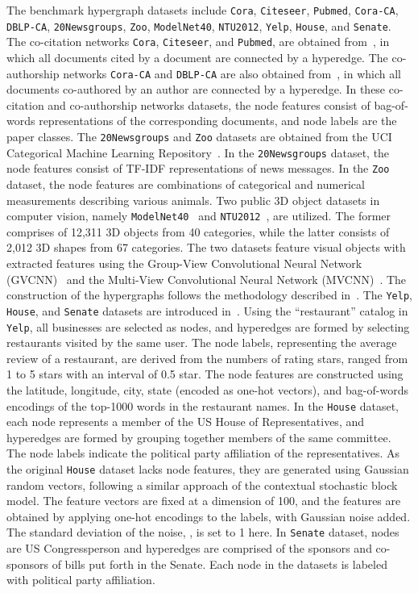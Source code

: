 \documentclass[review]{elsarticle}
\begin{document}
The benchmark hypergraph datasets include \texttt{Cora}, \texttt{Citeseer}, \texttt{Pubmed}, \texttt{Cora-CA}, \texttt{DBLP-CA}, \texttt{20Newsgroups}, \texttt{Zoo}, \texttt{ModelNet40}, \texttt{NTU2012}, \texttt{Yelp}, \texttt{House}, and \texttt{Senate}. The co-citation networks \texttt{Cora}, \texttt{Citeseer}, and \texttt{Pubmed}, are obtained from~\cite{yadati2019hypergcn}, in which all documents cited by a document are connected by a hyperedge. The co-authorship networks \texttt{Cora-CA} and \texttt{DBLP-CA} are also obtained from~\cite{yadati2019hypergcn}, in which all documents co-authored by an author are connected by a hyperedge. In these co-citation and co-authorship networks datasets, the node features consist of bag-of-words representations of the corresponding documents, and node labels are the paper classes. The \texttt{20Newsgroups} and \texttt{Zoo} datasets are obtained from the UCI Categorical Machine Learning Repository~\cite{asuncion2007uci}. In the \texttt{20Newsgroups} dataset, the node features consist of TF-IDF representations of news messages. In the \texttt{Zoo} dataset, the node features are combinations of categorical and numerical measurements describing various animals. Two public 3D object datasets in computer vision, namely \texttt{ModelNet40}~\cite{wu20153d} and \texttt{NTU2012}~\cite{chen2003visual}, are utilized. The former comprises of 12,311 3D objects from 40 categories, while the latter consists of 2,012 3D shapes from 67 categories. The two datasets feature visual objects with extracted features using the Group-View Convolutional Neural Network (GVCNN)~\cite{feng2018gvcnn} and the Multi-View Convolutional Neural Network (MVCNN)~\cite{su2015multi}. The construction of the hypergraphs follows the methodology described in~\cite{feng2019hypergraph,yang2022semi}. The \texttt{Yelp}, \texttt{House}, and \texttt{Senate} datasets are introduced in~\cite{chien2021you,fowler2006legislative}. Using the ``restaurant'' catalog in \texttt{Yelp}, all businesses are selected as nodes, and hyperedges are formed by selecting restaurants visited by the same user. The node labels, representing the average review of a restaurant, are derived from the numbers of rating stars, ranged from 1 to 5 stars with an interval of 0.5 star. The node features are constructed using the latitude, longitude, city, state (encoded as one-hot vectors), and bag-of-words encodings of the top-1000 words in the restaurant names. In the \texttt{House} dataset, each node represents a member of the US House of Representatives, and hyperedges are formed by grouping together members of the same committee. The node labels indicate the political party affiliation of the representatives. As the original \texttt{House} dataset lacks node features, they are generated using Gaussian random vectors, following a similar approach of the contextual stochastic block model. The feature vectors are fixed at a dimension of 100, and the features are obtained by applying one-hot encodings to the labels, with Gaussian noise  added. The standard deviation of the noise, , is set to 1 here. In \texttt{Senate} dataset, nodes are US Congressperson and hyperedges are comprised of the sponsors and co-sponsors of bills put forth in the Senate. Each node in the datasets is labeled with political party affiliation.
\end{document}
